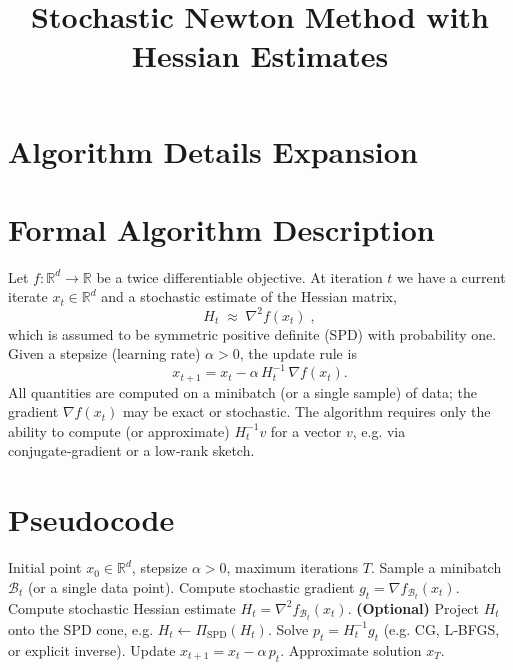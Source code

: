 \documentclass[11pt]{article}
\begin{document}
\title{Stochastic Newton Method with Hessian Estimates}
\author{}
\date{}
\maketitle

\section*{Algorithm Details Expansion}

\section{Formal Algorithm Description}
Let $f:\mathbb{R}^{d}\rightarrow\mathbb{R}$ be a twice differentiable objective.  
At iteration $t$ we have a current iterate $x_{t}\in\mathbb{R}^{d}$ and a stochastic
estimate of the Hessian matrix,
\[
H_{t}\;\approx\;\nabla^{2}f(x_{t})\;,
\]
which is assumed to be symmetric positive definite (SPD) with probability one.
Given a stepsize (learning rate) $\alpha>0$, the update rule is
\begin{equation}\label{eq:update}
x_{t+1}=x_{t}-\alpha\,H_{t}^{-1}\,\nabla f(x_{t}) .
\end{equation}
All quantities are computed on a minibatch (or a single sample) of data; the
gradient $\nabla f(x_{t})$ may be exact or stochastic.  The algorithm requires
only the ability to compute (or approximate) $H_{t}^{-1}v$ for a vector $v$,
e.g. via conjugate‑gradient or a low‑rank sketch.

\section{Pseudocode}
\begin{algorithm}[H]
\caption{Stochastic Newton with Hessian Estimates}
\label{alg:stoch-newton}
\begin{algorithmic}[1]
\REQUIRE Initial point $x_{0}\in\mathbb{R}^{d}$, stepsize $\alpha>0$, 
maximum iterations $T$.
    \STATE Sample a minibatch $\mathcal{B}_{t}$ (or a single data point).
    \STATE Compute stochastic gradient $g_{t}= \nabla f_{\mathcal{B}_{t}}(x_{t})$.
    \STATE Compute stochastic Hessian estimate $H_{t}= \nabla^{2}f_{\mathcal{B}_{t}}(x_{t})$.
    \STATE \textbf{(Optional)} Project $H_{t}$ onto the SPD cone,
          e.g. $H_{t}\leftarrow \Pi_{\text{SPD}}(H_{t})$.
    \STATE Solve $p_{t}=H_{t}^{-1}g_{t}$ (e.g. CG, L‑BFGS, or explicit inverse).
    \STATE Update $x_{t+1}=x_{t}-\alpha\,p_{t}$.
\ENDFOR
\ENSURE Approximate solution $x_{T}$.
\end{algorithmic}
\end{algorithm}
\end{document}
